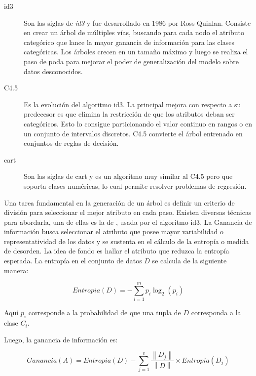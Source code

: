 \begin{description} 

   \item[\acrshort{id3}] Son las siglas de \textit{\acrlong{id3}} y fue
      desarrollado en 1986 por Ross Quinlan. Consiste en crear un árbol de
      múltiples vías, buscando para cada nodo el atributo categórico que lance
      la mayor ganancia de información para las clases categóricas. Los árboles
      crecen en un tamaño máximo y luego se realiza el paso de poda para mejorar
      el poder de generalización del modelo sobre datos desconocidos.

   \item[C4.5] Es la evolución del algoritmo \acrshort{id3}. La principal mejora
      con respecto a su predecesor es que elimina la restricción de que los
      atributos deban ser categóricos. Esto lo consigue particionando el valor
      continuo en rangos o en un conjunto de intervalos discretos. C4.5
      convierte el árbol entrenado en conjuntos de reglas de decisión. 

   \item[\acrshort{cart}] Son las siglas de \acrlong{cart} y es un algoritmo muy
      similar al C4.5 pero que soporta clases numéricas, lo cual permite
      resolver problemas de regresión. 

\end{description}

Una tarea fundamental en la generación de un árbol es definir un criterio de
división para seleccionar el mejor atributo en cada paso. Existen diversas
técnicas para abordarla, una de ellas es la de , usada por el algoritmo \acrshort{id3}. La Ganancia de información
busca seleccionar el atributo que posee mayor variabilidad o representatividad
de los datos y se sustenta en el cálculo de la entropía o medida de desorden. La
idea de fondo es hallar el atributo que reduzca la entropía esperada. La
entropía en el conjunto de datos $D$ se calcula de la siguiente manera:

\begin{equation}
   Entropia(D) = - \sum_{i=1}^{m} p_{i}\log_{2}(p_{i})
\end{equation}

Aquí $p_{i}$ corresponde a la probabilidad de que una tupla de $D$ corresponda a
la clase $C_{i}$.  

Luego, la ganancia de información es:

\begin{equation}
   Ganancia(A) = Entropia(D) 
   - \sum_{j=1}^{v} \frac{\left\| D_{j} \right\|}{\left\| D \right\|} 
   \times Entropia(D_{j})
\end{equation}

